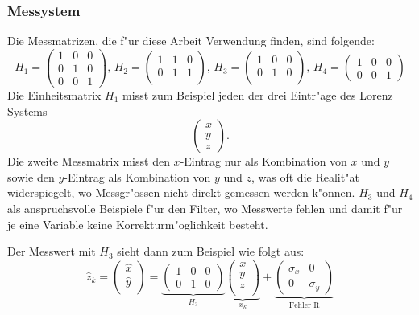 \begin{refsection}
\subsubsection{Messystem}
Die Messmatrizen, die f"ur diese Arbeit Verwendung finden, sind folgende:
\[H_{1}=\begin{pmatrix}
1 & 0 & 0 \\ 
0 & 1 & 0 \\ 
0 & 0 & 1
\end{pmatrix} 
\text{, }
H_{2}=\begin{pmatrix}
1 & 1 & 0 \\ 
0 & 1 & 1 \\ 
\end{pmatrix}
\text{, }
H_{3}=\begin{pmatrix}
1 & 0 & 0 \\ 
0 & 1 & 0 \\ 
\end{pmatrix}
\text{, }
H_{4}=\begin{pmatrix}
1 & 0 & 0 \\  
0 & 0 & 1
\end{pmatrix}
\]
Die Einheitsmatrix $H_{1}$ misst zum Beispiel jeden der drei Eintr"age des Lorenz Systems
\[
\begin{pmatrix}
x\\
y\\
z
\end{pmatrix}
\text{.}
\]
Die zweite Messmatrix misst den $x$-Eintrag nur als Kombination von $x$ und $y$ sowie den $y$-Eintrag als Kombination von $y$ und $z$, was oft die Realit"at widerspiegelt, wo Messgr"ossen nicht direkt gemessen werden k"onnen. $H_{3}$ und $H_{4}$ als anspruchsvolle Beispiele f"ur den Filter, wo Messwerte fehlen und damit f"ur je eine Variable keine Korrekturm"oglichkeit besteht.

Der Messwert mit $H_{3}$ sieht dann zum Beispiel wie folgt aus:
\[\hat{z}_{k}=
\begin{pmatrix}
\hat{x} \\
\hat{y} \\
\end{pmatrix}= 
\underbrace{\begin{pmatrix}
1 & 0 & 0  \\
0 & 1 & 0
\end{pmatrix}}_{H_{3}}
\underbrace{\begin{pmatrix}
x \\
y \\
z \\
\end{pmatrix}
}_{x_{k}}
+
\underbrace{\begin{pmatrix}
\sigma_{x} & 0 \\
0 & \sigma_{y}
\end{pmatrix}}_{\text{Fehler R}}
\]


\end{refsection}
